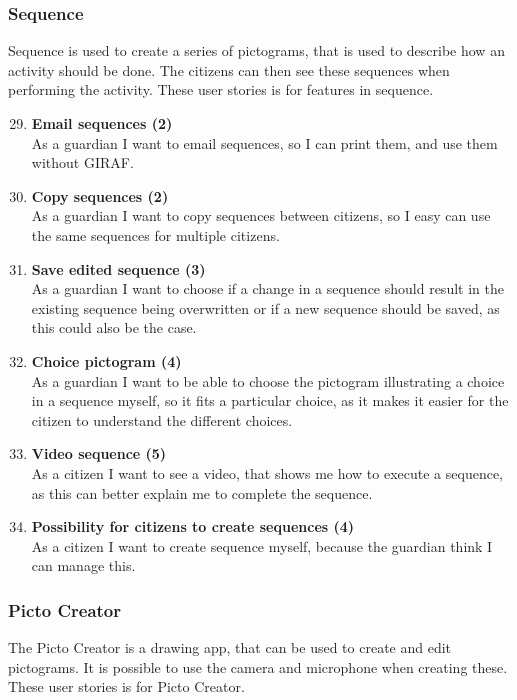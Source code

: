\subsubsection{Sequence}
Sequence is used to create a series of pictograms, that is used to describe how an activity should be done. The citizens can then see these sequences when performing the activity. These user stories is for features in sequence.

\begin{enumerate}
	\setcounter{enumi}{28} %
	\item \textbf{Email sequences (2)}\\
	As a guardian I want to email sequences, so I can print them, and use them without GIRAF.
	
	\item \textbf{Copy sequences (2)}\\
	As a guardian I want to copy sequences between citizens, so I easy can use the same sequences for multiple citizens.
	
	\item \textbf{Save edited sequence (3)}\\
	As a guardian I want to choose if a change in a sequence should result in the existing sequence being overwritten or if a new sequence should be saved, as this could also be the case. 
	
	\item \textbf{Choice pictogram (4)} \\
	As a guardian I want to be able to choose the pictogram illustrating a choice in a sequence myself, so it fits a particular choice, as it makes it easier for the citizen to understand the different choices.
	
	\item \textbf{Video sequence (5)} \\
	As a citizen I want to see a video, that shows me how to execute a sequence, as this can better explain me to complete the sequence.
	
	\item \textbf{Possibility for citizens to create sequences (4)}\\
	As a citizen I want to create sequence myself, because the guardian think I can manage this. 
\end{enumerate}

\subsubsection{Picto Creator}
The Picto Creator is a drawing app, that can be used to create and edit pictograms. It is possible to use the camera and microphone when creating these. These user stories is for Picto Creator.

